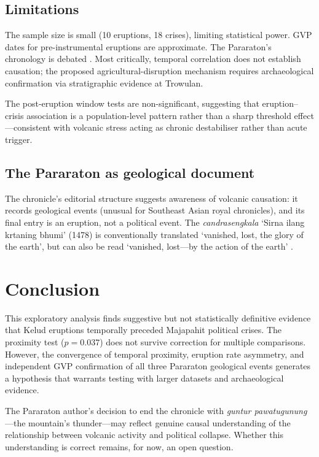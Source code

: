 \documentclass[12pt,a4paper]{article}
\begin{document}
\subsection{Limitations}

The sample size is small (10 eruptions, 18 crises), limiting statistical power.
GVP dates for pre-instrumental eruptions are approximate.
The Pararaton's chronology is debated \citep{noorduyn1978}.
Most critically, temporal correlation does not establish causation; the proposed agricultural-disruption mechanism requires archaeological confirmation via stratigraphic evidence at Trowulan.

The post-eruption window tests are non-significant, suggesting that eruption--crisis association is a population-level pattern rather than a sharp threshold effect---consistent with volcanic stress acting as chronic destabiliser rather than acute trigger.

\subsection{The Pararaton as geological document}

The chronicle's editorial structure suggests awareness of volcanic causation: it records geological events (unusual for Southeast Asian royal chronicles), and its final entry is an eruption, not a political event.
The \textit{candrasengkala} `Sirna ilang krtaning bhumi' (1478) is conventionally translated `vanished, lost, the glory of the earth', but can also be read `vanished, lost---by the action of the earth' \citep{satyana2015}.

\section{Conclusion}

This exploratory analysis finds suggestive but not statistically definitive evidence that Kelud eruptions temporally preceded Majapahit political crises.
The proximity test ($p = 0.037$) does not survive correction for multiple comparisons.
However, the convergence of temporal proximity, eruption rate asymmetry, and independent GVP confirmation of all three Pararaton geological events generates a hypothesis that warrants testing with larger datasets and archaeological evidence.

The Pararaton author's decision to end the chronicle with \textit{guntur pawatugunung}---the mountain's thunder---may reflect genuine causal understanding of the relationship between volcanic activity and political collapse.
Whether this understanding is correct remains, for now, an open question.
\end{document}
